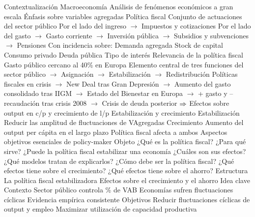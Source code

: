 \documentclass{nuevotema}
\begin{document}
\esquemalargo













\begin{esquemal}
	\1[] 
		\2 Contextualización
			\3 Macroeconomía
				\4 Análisis de fenómenos económicos a gran escala
				\4 Énfasis sobre variables agregadas
			\3 Política fiscal
				\4 Conjunto de actuaciones del sector público
				\4[] Por el lado del ingreso
				\4[] $\to$ Impuestos y cotizaciones
				\4[] Por el lado del gasto
				\4[] $\to$ Gasto corriente
				\4[] $\to$ Inversión pública
				\4[] $\to$ Subsidios y subvenciones
				\4[] $\to$ Pensiones
				\4[$\to$] Con incidencia sobre:
				\4[] Demanda agregada
				\4[] Stock de capital
				\4[] Consumo privado
				\4[] Deuda pública
				\4[] Tipo de interés
				\4 Relevancia de la política fiscal
				\4[] Gasto público cercano al 40\% en Europa
				\4[] Elemento central de tres funciones del sector público
				\4[] $\to$ Asignación
				\4[] $\to$ Estabilización
				\4[] $\to$ Redistribución
				\4[] Políticas fiscales en crisis
				\4[] $\to$ New Deal tras Gran Depresión
				\4[] $\to$ Aumento del gasto consolidado tras IIGM
				\4[] $\to$ Estado del Bienestar en Europa
				\4[] $\to$ + gasto y -- recaudación tras crisis 2008
				\4[] $\to$ Crisis de deuda posterior
				\4[] $\Rightarrow$ Efectos sobre output en c/p y crecimiento de l/p
			\3 Estabilización y crecimiento
				\4 Estabilización
				\4[] Reducir las amplitud de fluctuaciones de VAgregadas
				\4 Crecimiento
				\4[] Aumento del output per cápita en el largo plazo
				\4 Política fiscal afecta a ambos
				\4[] Aspectos objetivos esenciales de policy-maker
		\2 Objeto
			\3 ¿Qué es la política fiscal?
			\3 ¿Para qué sirve?
			\3 ¿Puede la política fiscal estabilizar una economía
			\3 ¿Cuáles son sus efectos?
			\3 ¿Qué modelos tratan de explicarlos?
			\3 ¿Cómo debe ser la política fiscal?
			\3 ¿Qué efectos tiene sobre el crecimiento?
			\3 ¿Qué efectos tiene sobre el ahorro?
		\2 Estructura
			\3 La política fiscal estabilizadora
			\3 Efectos sobre el crecimiento y el ahorro
	\1 
		\2 Idea clave
			\3 Contexto
				\4 Sector público controla \% de VAB
				\4 Economías sufren fluctuaciones cíclicas
				\4[] Evidencia empírica consistente
			\3 Objetivos
				\4 Reducir fluctuaciones cíclicas de output y empleo
				\4 Maximizar utilización de capacidad productiva

\end{esquemal}
\end{document}

